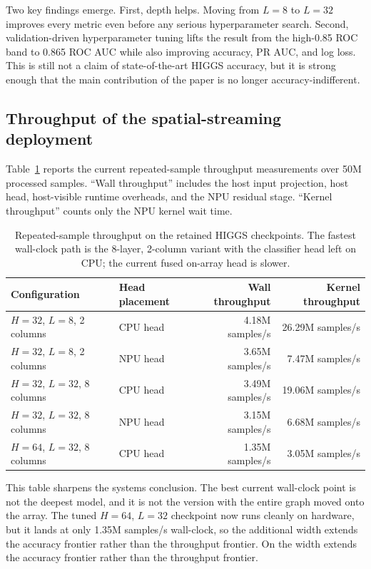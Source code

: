 \documentclass[a4paper,11pt]{article}
\begin{document}
Two key findings emerge. First, depth helps. Moving from $L=8$ to $L=32$
improves every metric even before any serious hyperparameter search. Second,
validation-driven hyperparameter tuning lifts the result from the high-0.85 ROC
band to 0.865 ROC AUC while also improving accuracy, PR AUC, and log loss.
This is still not a claim of state-of-the-art HIGGS accuracy, but it is strong
enough that the main contribution of the paper is no longer
accuracy-indifferent.

\subsection{Throughput of the spatial-streaming deployment}

Table~\ref{tab:higgs-throughput} reports the current repeated-sample throughput
measurements over 50M processed samples. ``Wall throughput'' includes the host
input projection, host head, host-visible runtime overheads, and the NPU
residual stage. ``Kernel throughput'' counts only the NPU kernel wait time.

\begin{table}[t]
\centering
\small
\begin{tabular}{@{}llrr@{}}
\toprule
Configuration & Head placement & Wall throughput & Kernel throughput \\
\midrule
$H=32$, $L=8$, 2 columns & CPU head & 4.18M samples/s & 26.29M samples/s \\
$H=32$, $L=8$, 2 columns & NPU head & 3.65M samples/s & 7.47M samples/s \\
$H=32$, $L=32$, 8 columns & CPU head & 3.49M samples/s & 19.06M samples/s \\
$H=32$, $L=32$, 8 columns & NPU head & 3.15M samples/s & 6.68M samples/s \\
$H=64$, $L=32$, 8 columns & CPU head & 1.35M samples/s & 3.05M samples/s \\
\bottomrule
\end{tabular}
\caption{Repeated-sample throughput on the retained HIGGS checkpoints. The
fastest wall-clock path is the 8-layer, 2-column variant with the classifier
head left on CPU; the current fused on-array head is slower.}
\label{tab:higgs-throughput}
\end{table}

This table sharpens the systems conclusion. The best current wall-clock point
is not the deepest model, and it is not the version with the entire graph moved
onto the array. The tuned $H=64$, $L=32$ checkpoint now runs cleanly on
hardware, but it lands at only 1.35M samples/s wall-clock, so the additional
width extends the accuracy frontier rather than the throughput frontier. On the
width extends the accuracy frontier rather than the throughput frontier.
\end{document}
